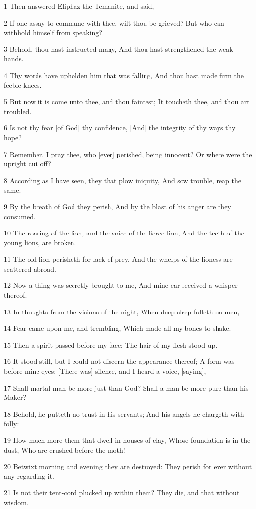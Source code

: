 \par 1 Then answered Eliphaz the Temanite, and said,
\par 2 If one assay to commune with thee, wilt thou be grieved? But who can withhold himself from speaking?
\par 3 Behold, thou hast instructed many, And thou hast strengthened the weak hands.
\par 4 Thy words have upholden him that was falling, And thou hast made firm the feeble knees.
\par 5 But now it is come unto thee, and thou faintest; It toucheth thee, and thou art troubled.
\par 6 Is not thy fear [of God] thy confidence, [And] the integrity of thy ways thy hope?
\par 7 Remember, I pray thee, who [ever] perished, being innocent? Or where were the upright cut off?
\par 8 According as I have seen, they that plow iniquity, And sow trouble, reap the same.
\par 9 By the breath of God they perish, And by the blast of his anger are they consumed.
\par 10 The roaring of the lion, and the voice of the fierce lion, And the teeth of the young lions, are broken.
\par 11 The old lion perisheth for lack of prey, And the whelps of the lioness are scattered abroad.
\par 12 Now a thing was secretly brought to me, And mine ear received a whisper thereof.
\par 13 In thoughts from the visions of the night, When deep sleep falleth on men,
\par 14 Fear came upon me, and trembling, Which made all my bones to shake.
\par 15 Then a spirit passed before my face; The hair of my flesh stood up.
\par 16 It stood still, but I could not discern the appearance thereof; A form was before mine eyes: [There was] silence, and I heard a voice, [saying],
\par 17 Shall mortal man be more just than God? Shall a man be more pure than his Maker?
\par 18 Behold, he putteth no trust in his servants; And his angels he chargeth with folly:
\par 19 How much more them that dwell in houses of clay, Whose foundation is in the dust, Who are crushed before the moth!
\par 20 Betwixt morning and evening they are destroyed: They perish for ever without any regarding it.
\par 21 Is not their tent-cord plucked up within them? They die, and that without wisdom.

